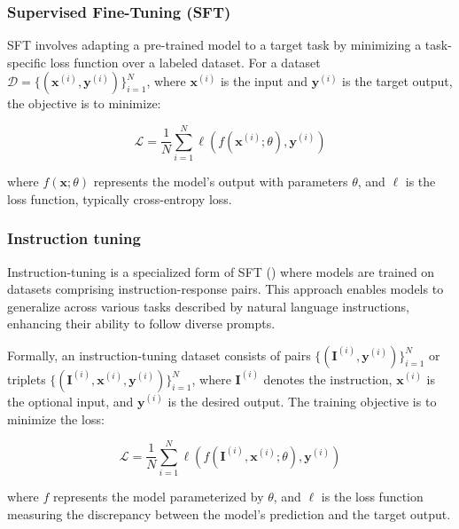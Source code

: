 \subsubsection{Supervised Fine-Tuning (SFT)}\label{app:sft}

SFT involves adapting a pre-trained model to a target task by minimizing a task-specific loss function over a labeled dataset. For a dataset \( \mathcal{D} = \{(\mathbf{x}^{(i)}, \mathbf{y}^{(i)})\}_{i=1}^N \), where \( \mathbf{x}^{(i)} \) is the input and \( \mathbf{y}^{(i)} \) is the target output, the objective is to minimize:

\begin{equation}
\mathcal{L} = \frac{1}{N} \sum_{i=1}^N \ell(f(\mathbf{x}^{(i)}; \theta), \mathbf{y}^{(i)})
\end{equation}

where \( f(\mathbf{x}; \theta) \) represents the model's output with parameters \( \theta \), and \( \ell \) is the loss function, typically cross-entropy loss.

\subsubsection{Instruction tuning} \label{app:instruction-tuning-it}

Instruction-tuning is a specialized form of SFT () where models are trained on datasets comprising instruction-response pairs. This approach enables models to generalize across various tasks described by natural language instructions, enhancing their ability to follow diverse prompts.

Formally, an instruction-tuning dataset consists of pairs \( \{(\mathbf{I}^{(i)}, \mathbf{y}^{(i)})\}_{i=1}^N \) or triplets \( \{(\mathbf{I}^{(i)}, \mathbf{x}^{(i)}, \mathbf{y}^{(i)})\}_{i=1}^N \), where \( \mathbf{I}^{(i)} \) denotes the instruction, \( \mathbf{x}^{(i)} \) is the optional input, and \( \mathbf{y}^{(i)} \) is the desired output. The training objective is to minimize the loss:

\begin{equation}
\mathcal{L} = \frac{1}{N} \sum_{i=1}^N \ell(f(\mathbf{I}^{(i)}, \mathbf{x}^{(i)}; \theta), \mathbf{y}^{(i)})
\end{equation}

where \( f \) represents the model parameterized by \( \theta \), and \( \ell \) is the loss function measuring the discrepancy between the model's prediction and the target output.

